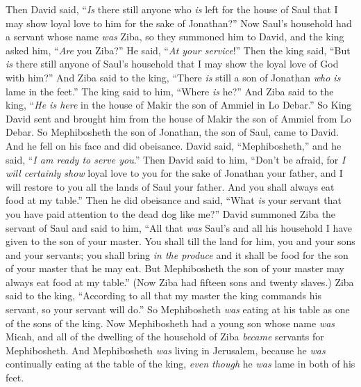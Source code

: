 \begin{biblechapter} %
 Then David said, “\textit{Is} there still anyone who \textit{is} left for the house of Saul that I may show loyal love to him for the sake of Jonathan?”
\verse Now Saul’s household had a servant whose name \textit{was} Ziba, so they summoned him to David, and the king asked him, “\textit{Are} you Ziba?” He said, “\textit{At your service}!”
\verse Then the king said, “But \textit{is} there still anyone of Saul’s household that I may show the loyal love of God with him?” And Ziba said to the king, “There \textit{is} still a son of Jonathan \textit{who is} lame in the feet.”
\verse The king said to him, “Where \textit{is} he?” And Ziba said to the king, “\textit{He \textit{is} here} in the house of Makir the son of Ammiel in Lo Debar.”
\verse So King David sent and brought him from the house of Makir the son of Ammiel from Lo Debar.
\verse So Mephibosheth the son of Jonathan, the son of Saul, came to David. And he fell on his face and did obeisance. David said, “Mephibosheth,” and he said, “\textit{I am ready to serve you}.”
\verse Then David said to him, “Don’t be afraid, for \textit{I will certainly show} loyal love to you for the sake of Jonathan your father, and I will restore to you all the lands of Saul your father. And you shall always eat food at my table.”
\verse Then he did obeisance and said, “What \textit{is} your servant that you have paid attention to the dead dog like me?”
\verse David summoned Ziba the servant of Saul and said to him, “All that \textit{was} Saul’s and all his household I have given to the son of your master.
\verse You shall till the land for him, you and your sons and your servants; you shall bring \textit{in the produce} and it shall be food for the son of your master that he may eat. But Mephibosheth the son of your master may always eat food at my table.” (Now Ziba had fifteen sons and twenty slaves.)
\verse Ziba said to the king, “According to all that my master the king commands his servant, so your servant will do.” So Mephibosheth \textit{was} eating at his table as one of the sons of the king.
\verse Now Mephibosheth had a young son whose name \textit{was} Micah, and all of the dwelling of the household of Ziba \textit{became} servants for Mephibosheth.
\verse And Mephibosheth \textit{was} living in Jerusalem, because he \textit{was} continually eating at the table of the king, \textit{even though} he \textit{was} lame in both of his feet.
\end{biblechapter}


